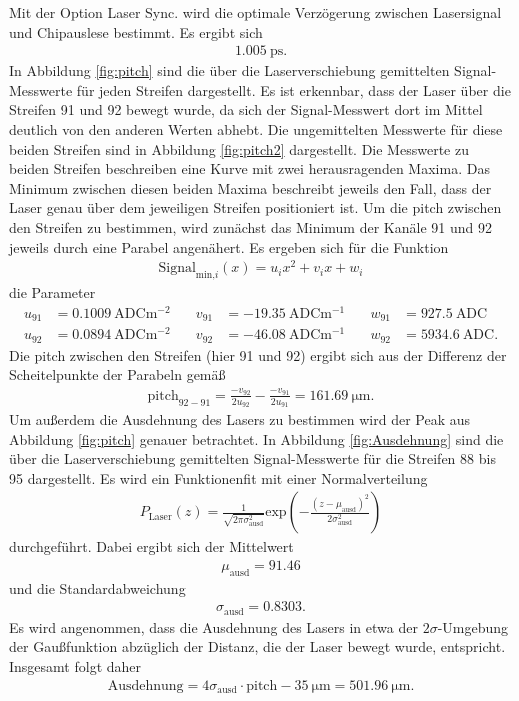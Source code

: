 Mit der Option Laser Sync. wird die optimale Verzögerung zwischen Lasersignal und
Chipauslese bestimmt. Es ergibt sich
\begin{align}
  \SI{1.005}{\pico\second}.
\end{align}
In Abbildung \ref{fig:pitch} sind die über die Laserverschiebung gemittelten Signal-Messwerte für jeden Streifen
dargestellt. Es ist erkennbar, dass der Laser über die Streifen 91 und 92 bewegt wurde,
da sich der Signal-Messwert dort im Mittel deutlich von den anderen Werten abhebt.
Die ungemittelten Messwerte für diese beiden Streifen sind in Abbildung \ref{fig:pitch2} dargestellt.
Die Messwerte zu beiden Streifen beschreiben eine Kurve mit zwei herausragenden Maxima.
Das Minimum zwischen diesen beiden Maxima beschreibt jeweils den Fall, dass der Laser genau über dem jeweiligen
Streifen positioniert ist. Um die pitch zwischen den Streifen zu bestimmen, wird zunächst das Minimum der Kanäle 91 und 92
jeweils durch eine Parabel angenähert. Es ergeben sich für die Funktion
\begin{align}
  \text{Signal}_{\text{min,}i}(x) = u_i x^2 + v_i x + w_i
\end{align}
die Parameter
\begin{align*}
  u_{91} &= \SI{0.1009}{\text{ADC}\meter\tothe{-2}} &\quad v_{91} &= \SI{-19.35}{\text{ADC}\meter\tothe{-1}} &\quad w_{91} &= \SI{927.5}{\text{ADC}} \\
  u_{92} &= \SI{0.0894}{\text{ADC}\meter\tothe{-2}} &\quad v_{92} &= \SI{-46.08}{\text{ADC}\meter\tothe{-1}} &\quad w_{92} &= \SI{5934.6}{\text{ADC}}.
\end{align*}
Die pitch zwischen den Streifen (hier 91 und 92) ergibt sich aus der Differenz der Scheitelpunkte der Parabeln gemäß
\begin{align}
  \text{pitch}_{92-91} = \frac{-v_{92}}{2u_{92}} - \frac{-v_{91}}{2u_{91}} = \SI{161.69}{\micro\meter}.
\end{align}
Um außerdem die Ausdehnung des Lasers zu bestimmen wird der Peak aus Abbildung \ref{fig:pitch} genauer betrachtet.
In Abbildung \ref{fig:Ausdehnung} sind die über die Laserverschiebung gemittelten Signal-Messwerte für die Streifen
88 bis 95 dargestellt. Es wird ein Funktionenfit mit einer Normalverteilung
\begin{align}
  P_\text{Laser}(z) = \frac{1}{\sqrt{2 \pi \sigma_\text{ausd}^2}} \text{exp}\left(-\frac{(z-\mu_\text{ausd})^2}{2\sigma_\text{ausd}^2}\right)
\end{align}
durchgeführt. Dabei ergibt sich der Mittelwert
\begin{align}
  \mu_\text{ausd} = 91.46
\end{align}
und die Standardabweichung
\begin{align}
  \sigma_\text{ausd} = 0.8303.
\end{align}
Es wird angenommen, dass die Ausdehnung des Lasers in etwa der $2\sigma$-Umgebung der Gaußfunktion abzüglich der Distanz, die der Laser bewegt wurde, entspricht.
Insgesamt folgt daher
\begin{align}
  \text{Ausdehnung} = 4\sigma_\text{ausd} \cdot \text{pitch} - \SI{35}{\micro\meter} = \SI{501.96}{\micro\meter}.
\end{align}

